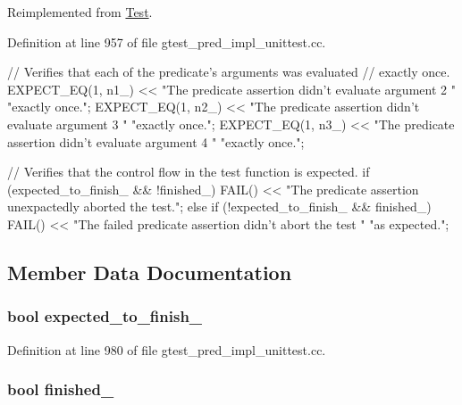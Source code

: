 \-Reimplemented from \hyperlink{classtesting_1_1Test_a931587596081ef8178c2b128facb0411}{\-Test}.



\-Definition at line 957 of file gtest\-\_\-pred\-\_\-impl\-\_\-unittest.\-cc.


\begin{DoxyCode}
                          {
    // Verifies that each of the predicate's arguments was evaluated
    // exactly once.
    EXPECT_EQ(1, n1_) <<
        "The predicate assertion didn't evaluate argument 2 "
        "exactly once.";
    EXPECT_EQ(1, n2_) <<
        "The predicate assertion didn't evaluate argument 3 "
        "exactly once.";
    EXPECT_EQ(1, n3_) <<
        "The predicate assertion didn't evaluate argument 4 "
        "exactly once.";

    // Verifies that the control flow in the test function is expected.
    if (expected_to_finish_ && !finished_) {
      FAIL() << "The predicate assertion unexpactedly aborted the test.";
    } else if (!expected_to_finish_ && finished_) {
      FAIL() << "The failed predicate assertion didn't abort the test "
                "as expected.";
    }
  }
\end{DoxyCode}


\subsection{\-Member \-Data \-Documentation}
\hypertarget{classPredicate3Test_af30fae6aaebdd5a6cb055c420573754d}{
\subsubsection[{expected\-\_\-to\-\_\-finish\-\_\-}]{\setlength{\rightskip}{0pt plus 5cm}bool {\bf expected\-\_\-to\-\_\-finish\-\_\-}}}\label{d5/d43/classPredicate3Test_af30fae6aaebdd5a6cb055c420573754d}


\-Definition at line 980 of file gtest\-\_\-pred\-\_\-impl\-\_\-unittest.\-cc.

\hypertarget{classPredicate3Test_a9189d6cfedf2ace6f5f6aa152ba38f83}{
\subsubsection[{finished\-\_\-}]{\setlength{\rightskip}{0pt plus 5cm}bool {\bf finished\-\_\-}}}\label{d5/d43/classPredicate3Test_a9189d6cfedf2ace6f5f6aa152ba38f83}


